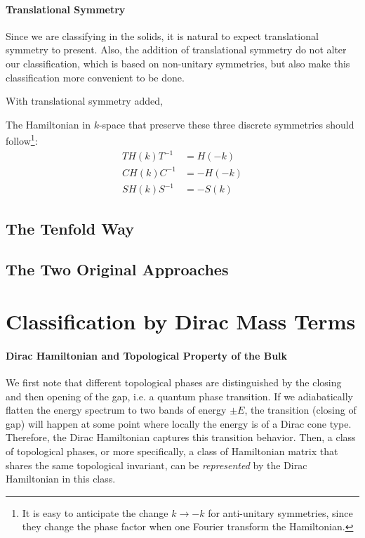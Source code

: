 \documentclass{article}
\begin{document}
\paragraph{Translational Symmetry}

Since we are classifying in the solids, it is natural to expect translational
symmetry to present. Also, the addition of translational symmetry do not alter
our classification, which is based on non-unitary symmetries, but also make this
classification more convenient to be done.

With translational symmetry added,

The Hamiltonian in $k$-space that preserve these three discrete symmetries
should follow\footnote{It is easy to anticipate the change $k\to -k$ for
    anti-unitary symmetries, since they change the phase factor when one Fourier
transform the Hamiltonian.}:
\begin{subequations}
\begin{align}
    \label{eq:T-sym-Hk}
    TH(k)T^{-1} &= H(-k) \\
    \label{eq:C-sym-Hk}
    CH(k)C^{-1} &= -H(-k) \\
    \label{eq:S-sym-Hk}
    SH(k)S^{-1} &= -S(k)
\end{align}
\end{subequations}

\subsection{The Tenfold Way}
\label{sec:The Tenfold Way}

% 

\subsection{The Two Original Approaches}
\label{sec:The Two Original Approaches}

\section{Classification by Dirac Mass Terms}
\label{sec:The Minimal Hamiltonian Approach}

\paragraph{Dirac Hamiltonian and Topological Property of the Bulk}
We first note that different topological phases are distinguished by the closing
and then opening of the gap, i.e. a quantum phase transition. If we adiabatically
flatten the energy spectrum to two bands of energy $\pm E$, the transition
(closing of gap) will happen at some point where locally the energy is of a
Dirac cone type. Therefore, the Dirac Hamiltonian captures this transition
behavior. Then, a class of topological phases, or more specifically, a class of
Hamiltonian matrix that shares the same topological invariant, can be
\textit{represented} by the Dirac Hamiltonian in this class.
\end{document}
